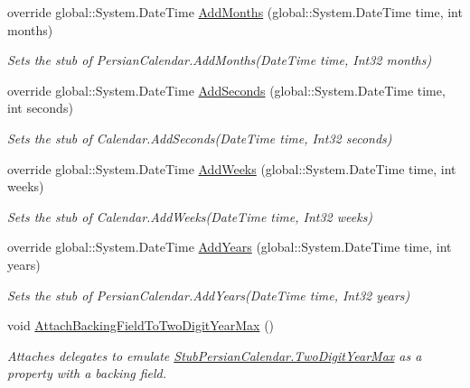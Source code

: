 \begin{DoxyCompactItemize}
override global\-::\-System.\-Date\-Time \hyperlink{class_system_1_1_globalization_1_1_fakes_1_1_stub_persian_calendar_a68d24ec103ceb19ba839d793ee7fbb8a}{Add\-Months} (global\-::\-System.\-Date\-Time time, int months)
\begin{DoxyCompactList}\small\item\em Sets the stub of Persian\-Calendar.\-Add\-Months(\-Date\-Time time, Int32 months)\end{DoxyCompactList}\item 
override global\-::\-System.\-Date\-Time \hyperlink{class_system_1_1_globalization_1_1_fakes_1_1_stub_persian_calendar_af3f565b9572b3c290809d279dbaa8c68}{Add\-Seconds} (global\-::\-System.\-Date\-Time time, int seconds)
\begin{DoxyCompactList}\small\item\em Sets the stub of Calendar.\-Add\-Seconds(\-Date\-Time time, Int32 seconds)\end{DoxyCompactList}\item 
override global\-::\-System.\-Date\-Time \hyperlink{class_system_1_1_globalization_1_1_fakes_1_1_stub_persian_calendar_a9101b7a73c2bd017cd310285e119b64e}{Add\-Weeks} (global\-::\-System.\-Date\-Time time, int weeks)
\begin{DoxyCompactList}\small\item\em Sets the stub of Calendar.\-Add\-Weeks(\-Date\-Time time, Int32 weeks)\end{DoxyCompactList}\item 
override global\-::\-System.\-Date\-Time \hyperlink{class_system_1_1_globalization_1_1_fakes_1_1_stub_persian_calendar_ad2284ff11dc649ce7ee14c38ed588d72}{Add\-Years} (global\-::\-System.\-Date\-Time time, int years)
\begin{DoxyCompactList}\small\item\em Sets the stub of Persian\-Calendar.\-Add\-Years(\-Date\-Time time, Int32 years)\end{DoxyCompactList}\item 
void \hyperlink{class_system_1_1_globalization_1_1_fakes_1_1_stub_persian_calendar_a57852235f993d56a24efffb2745f5d41}{Attach\-Backing\-Field\-To\-Two\-Digit\-Year\-Max} ()
\begin{DoxyCompactList}\small\item\em Attaches delegates to emulate \hyperlink{class_system_1_1_globalization_1_1_fakes_1_1_stub_persian_calendar_a51f7ac1714390c78a9334fda738cef70}{Stub\-Persian\-Calendar.\-Two\-Digit\-Year\-Max} as a property with a backing field.\end{DoxyCompactList}\item 

\end{DoxyCompactItemize}
